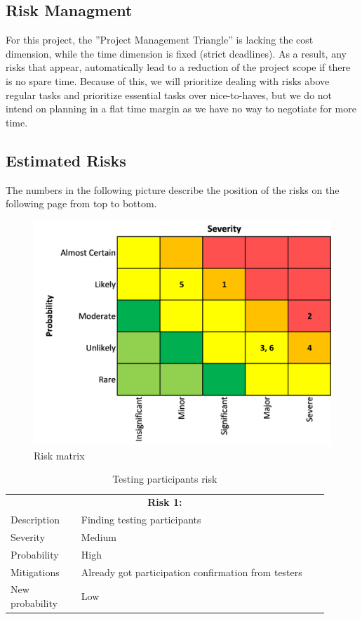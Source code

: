 \subsection{Risk Managment}
For this project, the ”Project Management Triangle” is lacking the cost dimension, while the time dimension is fixed (strict deadlines). As a result, any risks that appear, automatically lead to a reduction of the project scope if there is no spare time. Because of this, we will prioritize dealing with risks above regular tasks and prioritize essential tasks over nice-to-haves, but we do not intend on planning in a flat time margin as we have no way to negotiate for more time.

\subsection{Estimated Risks}
The numbers in the following picture describe the position of the risks on the following page from top to bottom.

\begin{figure}[H]
  \includegraphics[width=\linewidth]{resources/risks-matrix.png}
  \caption{Risk matrix}
  \label{risk_matrix}
\end{figure}

\begin{table}
  \centering
  \begin{tabular}{|p{0.2\linewidth}p{0.7\linewidth}|}
    \hline
    \multicolumn{2}{|c|}{\textbf{Risk 1:}}                     \\
    Description     & Finding testing participants           \\
    Severity        & Medium                                 \\
    Probability     & High                                   \\
    Mitigations     & Already got participation confirmation from testers  \\
    New probability & Low                                    \\
    \hline                           
  \end{tabular}
  \caption{Testing participants risk}
\end{table}

